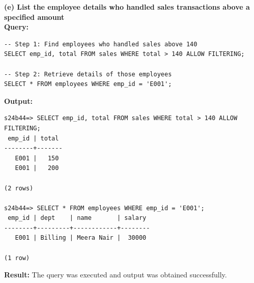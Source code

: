 \documentclass[12pt, a4paper]{article}
\begin{document}
\textbf{(e) List the employee details who handled sales transactions above a specified amount}\\
\textbf{Query:}
\begin{lstlisting}
-- Step 1: Find employees who handled sales above 140
SELECT emp_id, total FROM sales WHERE total > 140 ALLOW FILTERING;

-- Step 2: Retrieve details of those employees
SELECT * FROM employees WHERE emp_id = 'E001';
\end{lstlisting}
\textbf{Output:}
\begin{lstlisting}[style=terminal]
s24b44=> SELECT emp_id, total FROM sales WHERE total > 140 ALLOW FILTERING;
 emp_id | total
--------+-------
   E001 |   150
   E001 |   200

(2 rows)

s24b44=> SELECT * FROM employees WHERE emp_id = 'E001';
 emp_id | dept    | name       | salary
--------+---------+------------+--------
   E001 | Billing | Meera Nair |  30000

(1 row)
\end{lstlisting}

\textbf{Result:} The query was executed and output was obtained successfully.
\end{document}
